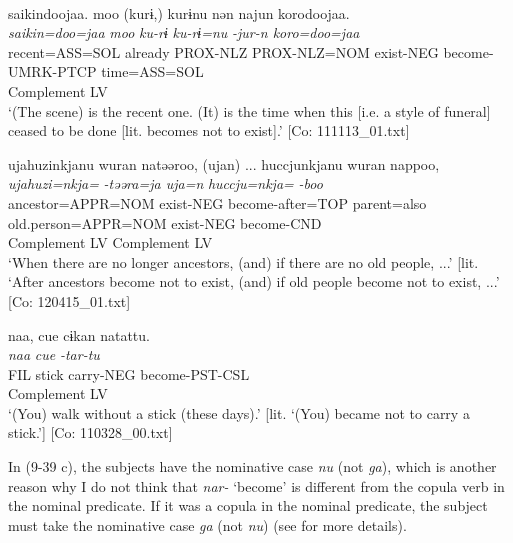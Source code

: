   \ex{}\\
    \gllll {\textbar}saikin{\textbar}doojaa.  {\textbar}moo{\textbar}  (kurɨ,)  kurɨnu  nən  najun  {\textbar}koro{\textbar}doojaa.\\
      \textit{saikin=doo=jaa}  \textit{moo}  \textit{ku-rɨ}  \textit{ku-rɨ=nu}  \textit{}  \textit{-jur-n  koro=doo=jaa}\\
      recent=ASS=SOL  already  PROX-NLZ  PROX-NLZ=NOM  exist-NEG  become-UMRK-PTCP  time=ASS=SOL\\
          {}             {}        {}          {}          Complement  LV \\
      \glt ‘(The scene) is the recent one. (It) is the time when this [i.e. a style of funeral] ceased to be done [lit. becomes not to exist].’   [Co: 111113\_01.txt]

\ex \label{ex:9.39c} %
    \gllll  ujahuzinkjanu  wuran  natəəroo,  (ujan)  ...  huccjunkjanu  wuran  nappoo,\\
      \textit{ujahuzi=nkja=}  \textit{}  \textit{-təəra=ja  uja=n} \textit{huccju=nkja=}  \textit{}  \textit{-boo}\\
      ancestor=APPR=NOM  exist-NEG  become-after=TOP  parent=also  old.person=APPR=NOM  exist-NEG  become-CND\\
        Complement  LV                                              Complement  LV\\
      \glt       ‘When there are no longer ancestors, (and) if there are no old people, ...’ [lit. ‘After ancestors become not to exist, (and) if old people become not to exist, ...’ [Co: 120415\_01.txt]

\ex \label{ex:9.39d} %
    \gllll  naa,  {\textbar}cue{\textbar}  cɨkan  natattu.\\
      \textit{naa}  \textit{cue}  \textit{}  \textit{-tar-tu}\\
      FIL  stick  carry-NEG  become-PST-CSL\\
          Complement  LV\\
      \glt       ‘(You) walk without a stick (these days).’ [lit. ‘(You) became not to carry a stick.’] [Co: 110328\_00.txt]
    \z
\z

In (9-39 c), the subjects have the nominative case \textit{nu} (not \textit{ga}), which is another reason why I do not think that \textit{nar-} ‘become’ is different from the copula verb in the nominal predicate. If it was a copula in the nominal predicate, the subject must take the nominative case \textit{ga} (not \textit{nu}) (see  for more details).

